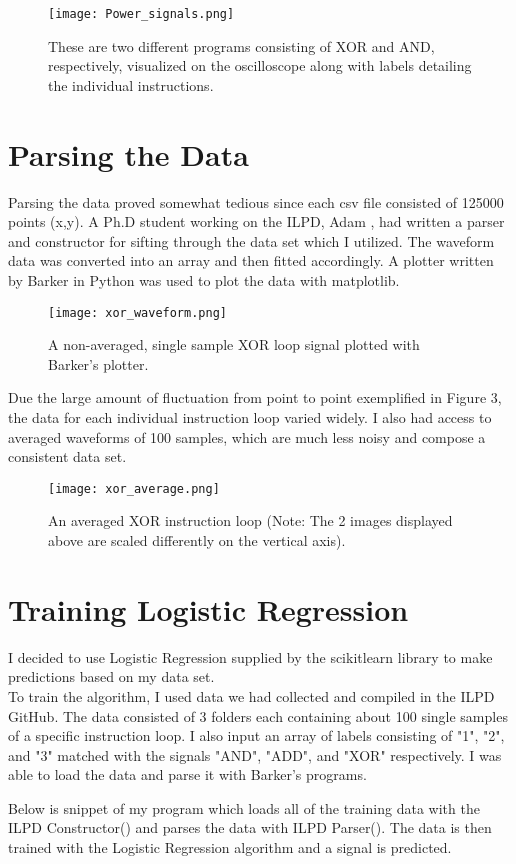 \documentclass{article}
\newcommand\tab[1][1cm]{\hspace*{#1}}
\begin{document}
\begin{figure}
    \centering
    \texttt{[image: Power\_signals.png]}
    \caption{These are two different programs consisting of XOR and AND, respectively, visualized on the oscilloscope along with  labels detailing the individual instructions.}
    \label{fig:my_label}
\end{figure}


\section{Parsing the Data}

\tab Parsing the data proved somewhat tedious since each csv file consisted of 125000 points (x,y). A Ph.D student working on the ILPD, Adam  \cite{barker}, had written a parser and constructor for sifting through the data set which I utilized. The waveform data was converted into an array and then fitted accordingly.  A plotter written by Barker in Python was used to plot the data with matplotlib.

    \begin{figure}[h]
        \centering
        \texttt{[image: xor\_waveform.png]}
        \caption{A non-averaged, single sample XOR loop signal plotted with Barker's plotter.}
        \label{fig:my_label}
    \end{figure}

\par Due the large amount of fluctuation from point to point exemplified in Figure 3, the data for each individual instruction loop varied widely. I also had access to averaged waveforms of 100 samples, which are much less noisy and compose a consistent data set. 

\begin{figure}[h]
        \centering
        \texttt{[image: xor\_average.png]}
        \caption{An averaged XOR instruction loop (Note: The 2 images displayed above are scaled differently on the vertical axis).}
        \label{fig:my_label}
    \end{figure}

\section{Training Logistic Regression}

I decided to use Logistic Regression supplied by the scikitlearn library \cite{scikit-learn} to make predictions based on my data set. \\To train the algorithm, I used data we had collected and compiled in the ILPD GitHub. The data consisted of 3 folders each containing about 100 single samples of a specific instruction loop. I also input an array of labels consisting of "1", "2", and "3" matched with the signals "AND", "ADD", and "XOR" respectively. I was able to load the data and parse it with Barker's programs. 
\\
\par Below is snippet of my program which loads all of the training data with the ILPD Constructor() and parses the data with ILPD Parser(). The data is then trained with the Logistic Regression algorithm and a signal is predicted.
\end{document}
